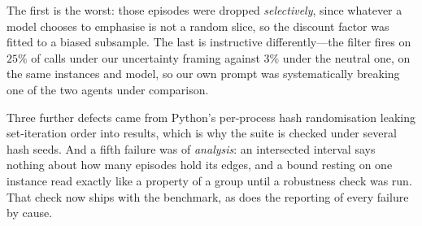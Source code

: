 \documentclass[10pt]{article}
\begin{document}
The first is the worst: those episodes were dropped \emph{selectively}, since
whatever a model chooses to emphasise is not a random slice, so the discount factor
was fitted to a biased subsample. The last is instructive differently---the filter
fires on $25\%$ of calls under our uncertainty framing against $3\%$ under the
neutral one, on the same instances and model, so our own prompt was systematically
breaking one of the two agents under comparison.

Three further defects came from Python's per-process hash randomisation leaking
set-iteration order into results, which is why the suite is checked under several
hash seeds. And a fifth failure was of \emph{analysis}: an intersected interval says
nothing about how many episodes hold its edges, and a bound resting on one instance
read exactly like a property of a group until a robustness check was run. That check
now ships with the benchmark, as does the reporting of every failure by cause.
\end{document}
